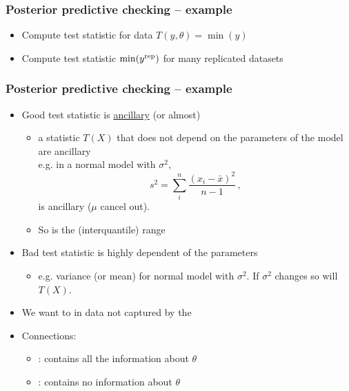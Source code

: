 \documentclass[10pt]{beamer}
\begin{document}

\begin{frame}[fragile]

\frametitle{Posterior predictive checking -- example}

  \begin{itemize}
  \item<1-> Compute test statistic for data $T(y,\theta)=\min(y)$
  \item<2-> Compute test statistic $\min(y^{\rm rep})$ for many replicated datasets
  \end{itemize}
  \vspace{-1.5\baselineskip}

\end{frame}


\begin{frame}[fragile]

\frametitle{Posterior predictive checking -- example}

  \begin{itemize}
  \item<1-> Good test statistic is \href{https://en.wikipedia.org/wiki/Ancillary_statistic}{ancillary} (or almost)
    \begin{itemize}
    \item a statistic $T(X)$ that does not depend on the parameters of the model are ancillary\\e.g. in a normal model with  $\sigma^2$,
    \[
    s^2 = \sum_i^n \frac{(x_i-\bar{x})^2}{n-1}\,,
    \]
    is ancillary ($\mu$ cancel out).
    \item So is the (interquantile) range
    \end{itemize}
  \item<2-> Bad test statistic is highly dependent of the parameters
    \begin{itemize}
    \item e.g. variance (or mean) for normal model with  $\sigma^2$. If $\sigma^2$ changes so will $T(X)$.
    \end{itemize}
  \item<3-> We want to  in data not captured by the 
  \item<4-> Connections:
  \begin{itemize}
    \item {}: contains all the information about $\theta$
    \item {}: contains no information about $\theta$
  \end{itemize}
  \end{itemize}

\end{frame}
\end{document}
